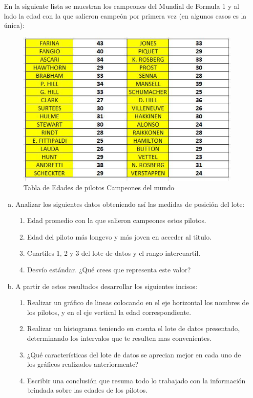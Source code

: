 \begin{actividad_previa}
	En la siguiente lista se muestran los campeones del Mundial de Formula 1 y al lado la edad con la que salieron campeón por primera vez (en algunos casos es la única):
	
	\begin{figure}[h!]
		\caption{Tabla de Edades de pilotos Campeones del mundo}
		\label{fig:05}
		\includegraphics[width=0.6\linewidth]{Trabajos/01/Anexos/05}
	\end{figure}
	
	\begin{enumerate}[a)]
		\item Analizar los siguientes datos obteniendo así las medidas de posición del lote:
		
		\begin{enumerate}
			\item Edad promedio con la que salieron campeones estos pilotos. 
			
			\item Edad del piloto más longevo y más joven en acceder al titulo.
			
			\item Cuartiles 1, 2 y 3 del lote de datos y el rango intercuartil.
			
			\item Desvío estándar. ¿Qué crees que representa este valor?
		\end{enumerate}
		
		\item A partir de estos resultados desarrollar los siguientes incisos:
		
		\begin{enumerate}
			\item Realizar un gráfico de lineas colocando en el eje horizontal los nombres de los pilotos, y en el eje vertical la edad correspondiente.
			
			\item Realizar un histograma teniendo en cuenta el lote de datos presentado, determinando los intervalos que te resulten mas convenientes.
			
			\item ¿Qué características del lote de datos se aprecian mejor en cada uno de los gráficos realizados anteriormente?
			
			\item Escribir una conclusión que resuma todo lo trabajado con la información brindada sobre las edades de los pilotos.
		\end{enumerate}
	\end{enumerate}
\end{actividad_previa}

